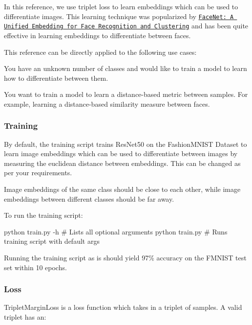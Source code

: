 In this reference, we use triplet loss to learn embeddings which can be used to differentiate images. This learning technique was popularized by \href{https://arxiv.org/abs/1503.03832}{\tt Face\+Net\+: A Unified Embedding for Face Recognition and Clustering} and has been quite effective in learning embeddings to differentiate between faces.

This reference can be directly applied to the following use cases\+:


\begin{DoxyItemize}
\item You have an unknown number of classes and would like to train a model to learn how to differentiate between them.
\item You want to train a model to learn a distance-\/based metric between samples. For example, learning a distance-\/based similarity measure between faces.
\end{DoxyItemize}

\subsubsection*{Training}

By default, the training script trains Res\+Net50 on the Fashion\+M\+N\+I\+ST Dataset to learn image embeddings which can be used to differentiate between images by measuring the euclidean distance between embeddings. This can be changed as per your requirements.

Image embeddings of the same class should be \textquotesingle{}close\textquotesingle{} to each other, while image embeddings between different classes should be \textquotesingle{}far\textquotesingle{} away.

To run the training script\+:


\begin{DoxyCode}
python train.py -h    # Lists all optional arguments
python train.py             # Runs training script with default args
\end{DoxyCode}


Running the training script as is should yield 97\% accuracy on the F\+M\+N\+I\+ST test set within 10 epochs.

\subsubsection*{Loss}

{\ttfamily Triplet\+Margin\+Loss} is a loss function which takes in a triplet of samples. A valid triplet has an\+:


